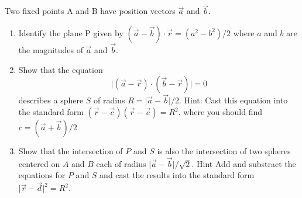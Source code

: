 Two fixed points A and B have position vectors $\vec{a}$ and $\vec{b}$.
\begin{enumerate}
	\item Identify the plane P given by $\left(\vec{a}-\vec{b}\right)\cdot \vec{r}=\left(a^2-b^2\right)/2$ where $a$ and $b$ are the magnitudes of $\vec{a}$ and $\vec{b}$. 
	\item Show that the equation 
		\begin{equation*}
 			\vert\left(\vec{a}-\vec{r}\right)\cdot\left(\vec{b}-\vec{r}\right)\vert=0
		\end{equation*}
describes a sphere $S$ of radius $R=\vert \vec{a} -\vec{b}\vert/2$. Hint: Cast this equation into the standard form $\left(\vec{r}-\vec{c}\right)\left(\vec{r}-\vec{c}\right)=R^2$. where you should find $c=\left(\vec{a}+\vec{b}\right)/2$

	\item Show that the intersection of $P$ and $S$ is also the intersection of two spheres centered on $A$ and $B$ each of radius $\vert \vec{a} -\vec{b}\vert/\sqrt{2}$. Hint Add and substract the equations for $P$ and $S$ and cast the results into the standard form $\vert\vec{r} -\vec{d}\vert^2=R^2$.

\end{enumerate}
	